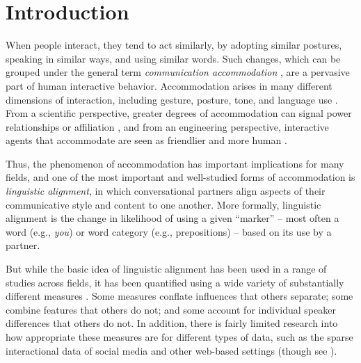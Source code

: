 \documentclass{acm_proc_article-sp}
\begin{document}



\section{Introduction}

When people interact, they tend to act similarly, by adopting similar postures, speaking in similar ways, and using similar words. Such changes, which can be grouped under the general term \textit{communication accommodation} \cite{GilesCouplandCoupland1991}, are a pervasive part of human interactive behavior. Accommodation arises in many different dimensions of interaction, including gesture, posture, tone, and language use \cite{CondonOgston1967,BourhisGiles1977,GilesSchererTaylor1979,LeveltKelter1982,HaleBurgoon1984,ChartrandvanBaaren2009}. From a scientific perspective, greater degrees of accommodation can signal power relationships or affiliation \cite{WillemynsEtAl1997,Gnisci2005,DNMEtAl2012}, and from an engineering perspective, interactive agents that accommodate are seen as friendlier and more human \cite{NassLee2000}. 

Thus, the phenomenon of accommodation has important implications for many fields, and one of the most important and well-studied forms of accommodation is \textit{linguistic alignment}, in which conversational partners align aspects of their communicative style and content to one another. More formally, linguistic alignment is the change in likelihood of using a given ``marker'' -- most often a word (e.g., \textit{you}) or word category (e.g., prepositions) -- based on its use by a partner. 

But while the basic idea of linguistic alignment has been used in a range of studies across fields, it has been quantified using a wide variety of substantially different measures \cite{IrelandEtAl2011,DNMGamonDumais2011,FusaroliEtAl2012}. Some measures conflate influences that others separate; some combine features that others do not; and some account for individual speaker differences that others do not. In addition, there is fairly limited research into how appropriate these measures are for different types of data, such as the sparse interactional data of social media and other web-based settings (though see \cite{XuReitter2015}).  
\end{document}
